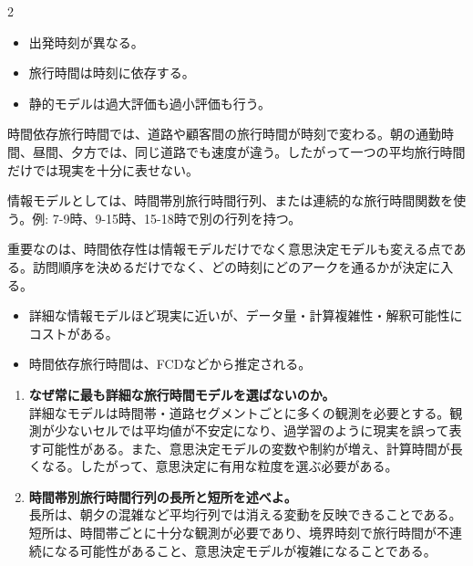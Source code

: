 \clearpage
{}
\begin{multicols}{2}\footnotesize\raggedcolumns
{}
\begin{itemize}
\item 出発時刻が異なる。
\item 旅行時間は時刻に依存する。
\item 静的モデルは過大評価も過小評価も行う。
\end{itemize}
時間依存旅行時間では、道路や顧客間の旅行時間が時刻で変わる。朝の通勤時間、昼間、夕方では、同じ道路でも速度が違う。したがって一つの平均旅行時間だけでは現実を十分に表せない。\par

情報モデルとしては、時間帯別旅行時間行列、または連続的な旅行時間関数を使う。例: 7-9時、9-15時、15-18時で別の行列を持つ。\par

重要なのは、時間依存性は情報モデルだけでなく意思決定モデルも変える点である。訪問順序を決めるだけでなく、どの時刻にどのアークを通るかが決定に入る。\par
{}
\begin{itemize}
\item 詳細な情報モデルほど現実に近いが、データ量・計算複雑性・解釈可能性にコストがある。
\item 時間依存旅行時間は、FCDなどから推定される。
\end{itemize}
\begin{enumerate}
\item \textbf{なぜ常に最も詳細な旅行時間モデルを選ばないのか。}\\詳細なモデルは時間帯・道路セグメントごとに多くの観測を必要とする。観測が少ないセルでは平均値が不安定になり、過学習のように現実を誤って表す可能性がある。また、意思決定モデルの変数や制約が増え、計算時間が長くなる。したがって、意思決定に有用な粒度を選ぶ必要がある。
\item \textbf{時間帯別旅行時間行列の長所と短所を述べよ。}\\長所は、朝夕の混雑など平均行列では消える変動を反映できることである。短所は、時間帯ごとに十分な観測が必要であり、境界時刻で旅行時間が不連続になる可能性があること、意思決定モデルが複雑になることである。
\end{enumerate}
\end{multicols}

